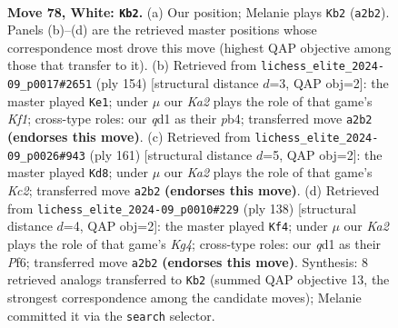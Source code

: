 \documentclass[11pt]{article}
\begin{document}
\clearpage

\begin{figure}[p]\centering
\begin{subfigure}{0.46\textwidth}\centering
\resizebox{\linewidth}{!}{%
\newchessgame
\chessboard[
  setfen={8/8/1p4k1/p7/2P5/8/K7/3q4 w - - 12 78},
  showmover=false,
  pgfstyle=straightmove, color=movearrow, markmove={a2-b2}
]}
\caption{}
\end{subfigure}\hfill
\begin{subfigure}{0.46\textwidth}\centering
\resizebox{\linewidth}{!}{%
\newchessgame
\chessboard[
  setfen={8/8/8/3k2p1/1p3pP1/8/8/5K2 w - - 0 78},
  showmover=false,
  pgfstyle=straightmove, color=movearrow, markmove={f1-e1}
]}
\caption{}
\end{subfigure}
\\[4pt]
\begin{subfigure}{0.46\textwidth}\centering
\resizebox{\linewidth}{!}{%
\newchessgame
\chessboard[
  setfen={8/2k5/p7/P7/1P2K3/8/8/8 b - - 0 81},
  showmover=false,
  pgfstyle=straightmove, color=movearrow, markmove={c7-d8}
]}
\caption{}
\end{subfigure}\hfill
\begin{subfigure}{0.46\textwidth}\centering
\resizebox{\linewidth}{!}{%
\newchessgame
\chessboard[
  setfen={8/8/p2k1P2/Pp6/6K1/8/8/8 w - - 1 70},
  showmover=false,
  pgfstyle=straightmove, color=movearrow, markmove={g4-f4}
]}
\caption{}
\end{subfigure}
\caption{\textbf{Move 78, White: \texttt{Kb2}.} (a) Our position; Melanie plays \texttt{Kb2} (\texttt{a2b2}). Panels (b)--(d) are the retrieved master positions whose correspondence most drove this move (highest QAP objective among those that transfer to it). (b) Retrieved from \texttt{lichess\_elite\_2024-09\_p0017\#2651} (ply 154) [structural distance $d$=3, QAP obj=2]: the master played \texttt{Ke1}; under $\mu$ our \emph{Ka2} plays the role of that game's \emph{Kf1}; cross-type roles: our \emph{q}d1 as their \emph{p}b4; transferred move \texttt{a2b2} \textbf{(endorses this move)}. (c) Retrieved from \texttt{lichess\_elite\_2024-09\_p0026\#943} (ply 161) [structural distance $d$=5, QAP obj=2]: the master played \texttt{Kd8}; under $\mu$ our \emph{Ka2} plays the role of that game's \emph{Kc2}; transferred move \texttt{a2b2} \textbf{(endorses this move)}. (d) Retrieved from \texttt{lichess\_elite\_2024-09\_p0010\#229} (ply 138) [structural distance $d$=4, QAP obj=2]: the master played \texttt{Kf4}; under $\mu$ our \emph{Ka2} plays the role of that game's \emph{Kg4}; cross-type roles: our \emph{q}d1 as their \emph{P}f6; transferred move \texttt{a2b2} \textbf{(endorses this move)}. Synthesis: 8 retrieved analogs transferred to \texttt{Kb2} (summed QAP objective 13, the strongest correspondence among the candidate moves); Melanie committed it via the \texttt{search} selector.}
\label{fig:thought-m154}
\end{figure}
\end{document}
